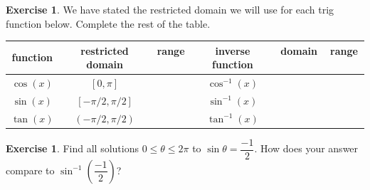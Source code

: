 \documentclass[11pt,reqno,final]{amsart}
\numberwithin{equation}{section}
\numberwithin{figure}{section}
\theoremstyle{definition} %
\newtheorem{exercise}[question]{Exercise}
\begin{document}
\begin{exercise}
        We have stated the restricted domain we will use for each trig function below.
        Complete the rest of the table.\\        
        {\renewcommand{\arraystretch}{3}%
          \begin{tabular}{|c|c|c||c|c|c|}
            \hline
            function & restricted domain & \qquad range \qquad $ $ & inverse function & \qquad domain \qquad $ $ & \qquad range \qquad $ $ \\ \hline \hline
            $\cos(x)$ & $[0,\pi]$ & & $\cos^{-1}(x)$ & & \\ \hline
            $\sin(x)$ & $[-\pi/2,\pi/2]$ & & $\sin^{-1}(x)$ & & \\ \hline
            $\tan(x)$ & $(-\pi/2,\pi/2)$ & & $\tan^{-1}(x)$ & & \\ \hline
          \end{tabular}
        }
\end{exercise}

\begin{exercise}
        Find all solutions $0 \leq \theta \leq 2\pi$ to $\sin \theta = \dfrac{-1}{2}$. How does your answer compare to $\sin^{-1}\left(\dfrac{-1}{2}\right)$?
\end{exercise}
\end{document}
